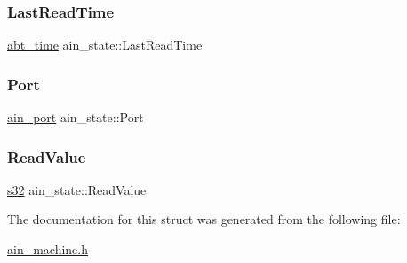 \mbox{\label{structain__state_a871210b0691c94540801b72c3a169f0d}} 
\subsubsection{\texorpdfstring{Last\+Read\+Time}{LastReadTime}}
{\footnotesize\ttfamily \hyperlink{ab__time_8h_adc59735fd0d20e93fe3016c8b6a4f782}{abt\+\_\+time} ain\+\_\+state\+::\+Last\+Read\+Time}

\mbox{\label{structain__state_a916756ec631a54c386895526b3e4a1cb}} 
\subsubsection{\texorpdfstring{Port}{Port}}
{\footnotesize\ttfamily \hyperlink{structain__port}{ain\+\_\+port} ain\+\_\+state\+::\+Port}

\mbox{\label{structain__state_a367c606e41f41737fc215f46fbed5271}} 
\subsubsection{\texorpdfstring{Read\+Value}{ReadValue}}
{\footnotesize\ttfamily \hyperlink{ab__common_8h_ae9b1af5c037e57a98884758875d3a7c4}{s32} ain\+\_\+state\+::\+Read\+Value}



The documentation for this struct was generated from the following file\+:\begin{DoxyCompactItemize}
\item 
\hyperlink{ain__machine_8h}{ain\+\_\+machine.\+h}\end{DoxyCompactItemize}
